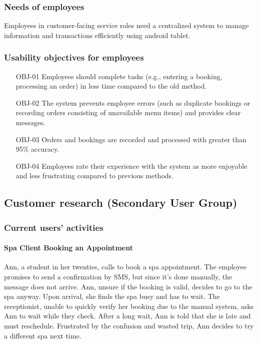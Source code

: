 \documentclass[]{VUMIFTemplateClass}
\newcommand{\subsubsubsection}[1]{\paragraph{#1}}
\begin{document}
\subsubsection{Needs of employees}
Employees in customer-facing service roles need a centralized system to manage information and transactions efficiently using android tablet. 
\subsubsection{Usability objectives for employees}
\begin{itemize}
    \item[OBJ-01] Employees should complete tasks (e.g., entering a booking, processing an order) in less time compared to the old method.
    \item[OBJ-02] The system prevents employee errors (such as duplicate bookings or recording orders consisting of unavailable menu items) and provides clear messages.
    \item[OBJ-03] Orders and bookings are recorded and processed with greater than 95\% accuracy.
    \item[OBJ-04] Employees rate their experience with the system as more enjoyable and less frustrating compared to previous methods.
\end{itemize}

\subsection{Customer research (Secondary User Group)}
\subsubsection{Current users' activities}

\subsubsubsection{Spa Client Booking an Appointment}
Ann, a student in her twenties, calls to book a spa appointment. The employee
promises to send a confirmation by SMS, but since it’s done manually, the
message does not arrive. Ann, unsure if the booking is valid, decides to go to
the spa anyway. Upon arrival, she finds the spa busy and has to wait. The
receptionist, unable to quickly verify her booking due to the manual system,
asks Ann to wait while they check. After a long wait, Ann is told that she is
late and must reschedule. Frustrated by the confusion and wasted trip, Ann
decides to try a different spa next time.
\end{document}
